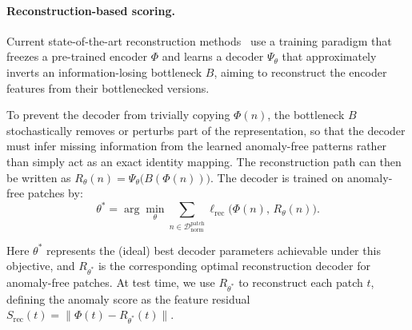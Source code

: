 \documentclass{article}
\theoremstyle{plain}
\theoremstyle{definition}
\theoremstyle{remark}
\begin{document}
\paragraph{Reconstruction-based scoring.}


Current state-of-the-art reconstruction methods~\cite{you2022unified,guo2025dinomaly,zhang2023exploring} use a training paradigm that freezes a pre-trained encoder $\Phi$ and learns a decoder $\Psi_\theta$ that approximately inverts an information-losing bottleneck $B$, aiming to reconstruct the encoder features from their bottlenecked versions.


To prevent the decoder from trivially copying $\Phi(n)$, the bottleneck $B$ stochastically removes or perturbs part of the representation, so that the decoder must infer missing information from the learned anomaly-free patterns rather than simply act as an exact identity mapping.
The reconstruction path can then be written as $R_\theta(n) = \Psi_\theta\big(B(\Phi(n))\big)$.
The decoder is trained on anomaly-free patches by: 
\begin{equation}
\theta^* = \arg\min_\theta
    \sum_{n \in \mathcal{D}_{\mathrm{norm}}^{\mathrm{patch}}}
    \ell_{\mathrm{rec}}\big(\Phi(n),\, R_\theta(n)).
\end{equation}

Here $\theta^*$ represents the (ideal) best decoder parameters achievable under this objective, and $R_{\theta^*}$ is the corresponding optimal reconstruction decoder for anomaly-free patches. At test time, we use $R_{\theta^*}$ to reconstruct each patch $t$, defining the anomaly score as the feature residual
$
    S_{\mathrm{rec}}(t) = \big\|\Phi(t) - R_{\theta^*}(t)\big\|.
$
\label{eqa:residual_score}
\end{document}
